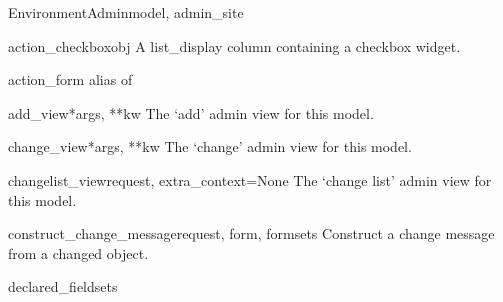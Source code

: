 \documentclass[letterpaper,10pt,english]{sphinxmanual}
\begin{document}
\hypertarget{data.admin.EnvironmentAdmin}{}\begin{classdesc}{EnvironmentAdmin}{model, admin\_site}~

\hypertarget{data.admin.EnvironmentAdmin.action_checkbox}{}\begin{methoddesc}{action\_checkbox}{obj}
A list\_display column containing a checkbox widget.
\end{methoddesc}

\hypertarget{data.admin.EnvironmentAdmin.action_form}{}\begin{memberdesc}{action\_form}
alias of 
\end{memberdesc}

\hypertarget{data.admin.EnvironmentAdmin.add_view}{}\begin{methoddesc}{add\_view}{*args, **kw}
The `add' admin view for this model.
\end{methoddesc}

\hypertarget{data.admin.EnvironmentAdmin.change_view}{}\begin{methoddesc}{change\_view}{*args, **kw}
The `change' admin view for this model.
\end{methoddesc}

\hypertarget{data.admin.EnvironmentAdmin.changelist_view}{}\begin{methoddesc}{changelist\_view}{request, extra\_context=None}
The `change list' admin view for this model.
\end{methoddesc}

\hypertarget{data.admin.EnvironmentAdmin.construct_change_message}{}\begin{methoddesc}{construct\_change\_message}{request, form, formsets}
Construct a change message from a changed object.
\end{methoddesc}

\hypertarget{data.admin.EnvironmentAdmin.declared_fieldsets}{}\begin{memberdesc}{declared\_fieldsets}\end{memberdesc}


\end{classdesc}
\end{document}
